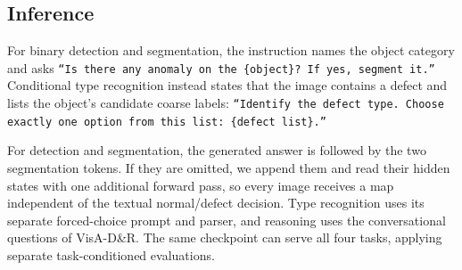 
\subsection{Inference}
For binary detection and segmentation, the instruction names the object category and asks \texttt{``Is there any anomaly on the \{object\}? If yes, segment it.''} Conditional type recognition instead states that the image contains a defect and lists the object's candidate coarse labels: \texttt{``Identify the defect type. Choose exactly one option from this list: \{defect list\}.''}

For detection and segmentation, the generated answer is followed by the two segmentation tokens. If they are omitted, we append them and read their hidden states with one additional forward pass, so every image receives a map independent of the textual normal/defect decision. Type recognition uses its separate forced-choice prompt and parser, and reasoning uses the conversational questions of VisA-D\&R. The same checkpoint can serve all four tasks, applying separate task-conditioned evaluations.


